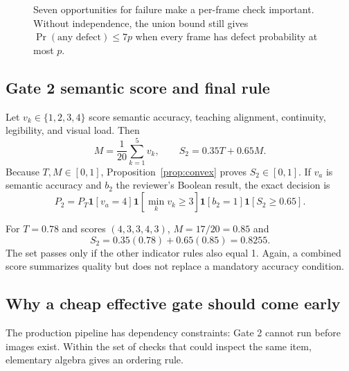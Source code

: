 \documentclass[11pt]{article}
\newcommand{\ind}[1]{\mathbf{1}\!\left[#1\right]}
\theoremstyle{plain}
\theoremstyle{definition}
\begin{document}
\begin{figure}[H]
\centering
{}
\caption{Seven opportunities for failure make a per-frame check important. Without independence, the union bound still gives $\Pr(\text{any defect})\le7p$ when every frame has defect probability at most $p$.}
\label{fig:defect-probability}
\end{figure}

\subsection{Gate 2 semantic score and final rule}

Let $v_k\in\{1,2,3,4\}$ score semantic accuracy, teaching alignment, continuity, legibility, and visual load. Then
\begin{equation}
M=\frac1{20}\sum_{k=1}^5v_k,
\qquad
S_2=0.35T+0.65M.
\end{equation}
Because $T,M\in[0,1]$, Proposition~\ref{prop:convex} proves $S_2\in[0,1]$. If $v_a$ is semantic accuracy and $b_2$ the reviewer's Boolean result, the exact decision is
\begin{equation}
P_2=P_T\ind{v_a=4}\ind{\min_kv_k\ge3}\ind{b_2=1}\ind{S_2\ge0.65}.
\end{equation}

For $T=0.78$ and scores $(4,3,3,4,3)$, $M=17/20=0.85$ and
\[
S_2=0.35(0.78)+0.65(0.85)=0.8255.
\]
The set passes only if the other indicator rules also equal 1. Again, a combined score summarizes quality but does not replace a mandatory accuracy condition.

\subsection{Why a cheap effective gate should come early}

The production pipeline has dependency constraints: Gate 2 cannot run before images exist. Within the set of checks that could inspect the same item, elementary algebra gives an ordering rule.
\end{document}
